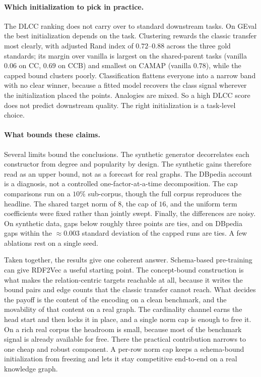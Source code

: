 \documentclass[a4paper,oneside,bibliography=totoc]{scrbook}
\begin{document}
\paragraph{Which initialization to pick in practice.} The DLCC ranking does not
carry over to standard downstream tasks. On GEval the best initialization depends
on the task. Clustering rewards the classic transfer most clearly, with adjusted
Rand index of $0.72$--$0.88$ across the three gold standards; its margin over
vanilla is largest on the shared-parent tasks (vanilla $0.06$ on CC, $0.69$ on
CCB) and smallest on CAMAP (vanilla $0.78$), while the capped bound
clusters poorly. Classification flattens everyone into a narrow band with no clear
winner, because a fitted model recovers the class signal wherever the
initialization placed the points. Analogies are mixed. So a high DLCC score does
not predict downstream quality. The right initialization is a task-level choice.

\paragraph{What bounds these claims.} Several limits bound the conclusions. The
synthetic generator decorrelates each constructor from degree and popularity by
design. The synthetic gains therefore read as an upper bound, not as a forecast
for real graphs. The DBpedia account is a diagnosis, not a controlled
one-factor-at-a-time decomposition. The cap comparisons run on a $10\%$
sub-corpus, though the full corpus reproduces the headline. The shared target
norm of $8$, the cap of $16$, and the uniform term coefficients were fixed rather
than jointly swept. Finally, the differences are noisy. On synthetic data, gaps
below roughly three points are ties, and on DBpedia gaps within the
$\approx\!0.003$ standard deviation of the capped runs are ties. A few ablations
rest on a single seed.

Taken together, the results give one coherent answer. Schema-based pre-training
can give RDF2Vec a useful starting point. The concept-bound construction is what
makes the relation-centric targets reachable at all, because it writes the bound
pairs and edge counts that the classic transfer cannot reach. What decides the
payoff is the content of the encoding on a clean benchmark, and the movability of
that content on a real graph. The cardinality channel earns the head start and
then locks it in place, and a single norm cap is enough to free it. On a rich real
corpus the headroom is small, because most of the benchmark signal is already
available for free. There the practical contribution narrows to one cheap and
robust component. A per-row norm cap keeps a schema-bound initialization from
freezing and lets it stay competitive end-to-end on a real knowledge graph.
\end{document}
